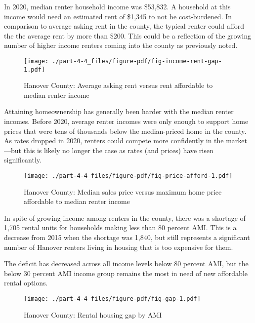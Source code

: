 \documentclass[
  letterpaper,
  DIV=11,
  numbers=noendperiod]{scrreprt}
\begin{document}
In 2020, median renter household income was \$53,832. A household at
this income would need an estimated rent of \$1,345 to not be
cost-burdened. In comparison to average asking rent in the county, the
typical renter could afford the the average rent by more than \$200.
This could be a reflection of the growing number of higher income
renters coming into the county as previously noted.

\begin{figure}

{\centering \texttt{[image: ./part-4-4\_files/figure-pdf/fig-income-rent-gap-1.pdf]}

}

\caption{\label{fig-income-rent-gap}Hanover County: Average asking rent
versus rent affordable to median renter income}

\end{figure}

Attaining homeownership has generally been harder with the median renter
incomes. Before 2020, average renter incomes were only enough to support
home prices that were tens of thousands below the median-priced home in
the county. As rates dropped in 2020, renters could compete more
confidently in the market---but this is likely no longer the case as
rates (and prices) have risen significantly.

\begin{figure}

{\centering \texttt{[image: ./part-4-4\_files/figure-pdf/fig-price-afford-1.pdf]}

}

\caption{\label{fig-price-afford}Hanover County: Median sales price
versus maximum home price affordable to median renter income}

\end{figure}

In spite of growing income among renters in the county, there was a
shortage of 1,705 rental units for households making less than 80
percent AMI. This is a decrease from 2015 when the shortage was 1,840,
but still represents a significant number of Hanover renters living in
housing that is too expensive for them.

The deficit has decreased across all income levels below 80 percent AMI,
but the below 30 percent AMI income group remains the most in need of
new affordable rental options.

\begin{figure}

{\centering \texttt{[image: ./part-4-4\_files/figure-pdf/fig-gap-1.pdf]}

}

\caption{\label{fig-gap}Hanover County: Rental housing gap by AMI}

\end{figure}
\end{document}
